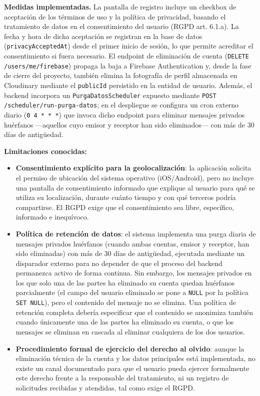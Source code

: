 \textbf{Medidas implementadas.} La pantalla de registro incluye un checkbox de aceptación de los términos de uso y la política de privacidad, basando el tratamiento de datos en el consentimiento del usuario (RGPD art. 6.1.a). La fecha y hora de dicha aceptación se registran en la base de datos (\texttt{privacyAcceptedAt}) desde el primer inicio de sesión, lo que permite acreditar el consentimiento si fuera necesario. El endpoint de eliminación de cuenta (\texttt{DELETE /users/me/firebase}) propaga la baja a Firebase Authentication y, desde la fase de cierre del proyecto, también elimina la fotografía de perfil almacenada en Cloudinary mediante el \texttt{publicId} persistido en la entidad de usuario. Además, el backend incorpora un \texttt{PurgaDatosScheduler} expuesto mediante \texttt{POST /scheduler/run-purga-datos}; en el despliegue se configura un cron externo diario (\texttt{0 4 * * *}) que invoca dicho endpoint para eliminar mensajes privados huérfanos —aquellos cuyo emisor y receptor han sido eliminados— con más de 30 días de antigüedad.

\textbf{Limitaciones conocidas:}

\begin{itemize}
    \item \textbf{Consentimiento explícito para la geolocalización}: la aplicación solicita el permiso de ubicación del sistema operativo (iOS/Android), pero no incluye una pantalla de consentimiento informado que explique al usuario para qué se utiliza su localización, durante cuánto tiempo y con qué terceros podría compartirse. El RGPD exige que el consentimiento sea libre, específico, informado e inequívoco.

    \item \textbf{Política de retención de datos}: el sistema implementa una purga diaria de mensajes privados huérfanos (cuando ambas cuentas, emisor y receptor, han sido eliminadas) con más de 30 días de antigüedad, ejecutada mediante un disparador externo para no depender de que el proceso del backend permanezca activo de forma continua. Sin embargo, los mensajes privados en los que solo una de las partes ha eliminado su cuenta quedan huérfanos parcialmente (el campo del usuario eliminado se pone a \texttt{NULL} por la política \texttt{SET NULL}), pero el contenido del mensaje no se elimina. Una política de retención completa debería especificar que el contenido se anonimiza también cuando únicamente una de las partes ha eliminado su cuenta, o que los mensajes se eliminan en cascada al eliminar cualquiera de los dos usuarios.

    \item \textbf{Procedimiento formal de ejercicio del derecho al olvido}: aunque la eliminación técnica de la cuenta y los datos principales está implementada, no existe un canal documentado para que el usuario pueda ejercer formalmente este derecho frente a la responsable del tratamiento, ni un registro de solicitudes recibidas y atendidas, tal como exige el RGPD.
\end{itemize}

